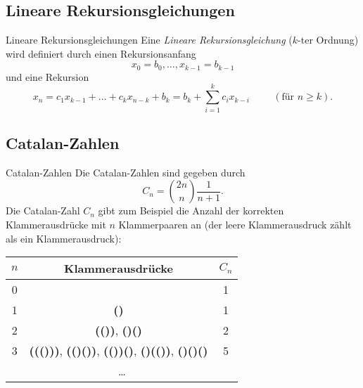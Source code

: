 \documentclass[../../main.tex]{subfiles}
\begin{document}

\subsection{Lineare Rekursionsgleichungen}
\begin{nutshell}{Lineare Rekursionsgleichungen}
    Eine \emph{Lineare Rekursionsgleichung} ($k$-ter Ordnung) wird definiert durch einen Rekursionsanfang
    \[x_0 = b_0, \dots, x_{k-1} = b_{k-1}\]
    und eine Rekursion
    \[x_n = c_1 x_{k-1} + \dots + c_k x_{n-k} + b_k = b_k + \sum_{i=1}^{k} c_ix_{k-i} \hspace{1cm}(\text{für }n \geq k).\]
\end{nutshell}

\subsection{Catalan-Zahlen}
\begin{nutshell}{Catalan-Zahlen}
    Die Catalan-Zahlen sind gegeben durch
    \[C_n = \binom{2n}{n} \frac{1}{n+1}.\]
    Die Catalan-Zahl $C_n$ gibt zum Beispiel die Anzahl der korrekten Klammerausdrücke mit $n$ Klammerpaaren an (der leere Klammerausdruck zählt als ein Klammerausdruck):
    \begin{center}
        \newcommand{\tmp}[2]{\textcolor{#1!80!black}{\textbf{(}#2\textbf{)}}}
        \begin{tabular}{ccc}\toprule
            $n$ & Klammerausdrücke & $C_n$ \\\midrule
            0 & & 1\\
            1 & \tmp{green}{} & 1\\
            2 & \tmp{green}{\tmp{red}{}}, \tmp{green}{}\tmp{red}{} & 2\\
            3 & \tmp{green}{\tmp{red}{\tmp{blue}{}}}, \tmp{green}{\tmp{red}{}\tmp{blue}{}}, \tmp{green}{\tmp{red}{}}\tmp{blue}{}, \tmp{green}{}\tmp{red}{\tmp{blue}{}}, \tmp{green}{}\tmp{red}{}\tmp{blue}{} & 5\\
            \multicolumn{3}{c}{\dots}\\\bottomrule
        \end{tabular}
    \end{center}
\end{nutshell}
\end{document}
